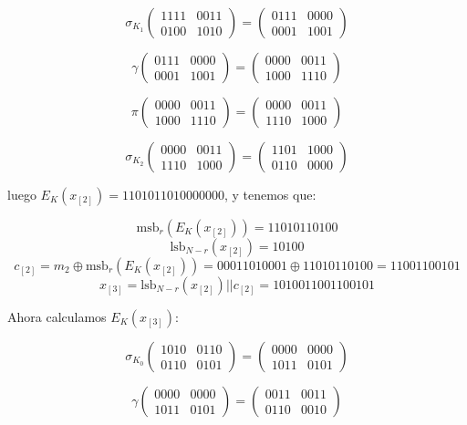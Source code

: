 \documentclass[a4paper]{article}
\begin{document}
$$\sigma_{K_1} \begin{pmatrix} 1111 & 0011 \\ 0100 & 1010 \end{pmatrix} = \begin{pmatrix} 0111 & 0000 \\ 0001 & 1001 \end{pmatrix}$$

$$\gamma \begin{pmatrix} 0111 & 0000 \\ 0001 & 1001 \end{pmatrix} = \begin{pmatrix} 0000 & 0011 \\ 1000 & 1110 \end{pmatrix}$$

$$\pi \begin{pmatrix} 0000 & 0011 \\ 1000 & 1110 \end{pmatrix} = \begin{pmatrix} 0000 & 0011 \\ 1110 & 1000 \end{pmatrix}$$

$$\sigma_{K_2} \begin{pmatrix} 0000 & 0011 \\ 1110 & 1000 \end{pmatrix} = \begin{pmatrix} 1101 & 1000 \\ 0110 & 0000 \end{pmatrix}$$

luego $E_K(x_{[2]}) = 1101 0110 1000 0000$, y tenemos que:

$$\text{msb}_r (E_K(x_{[2]})) = 1101 0110 100$$
$$\text{lsb}_{N-r} (x_{[2]}) = 10100$$
$$c_{[2]} = m_2 \oplus \text{msb}_r(E_K(x_{[2]})) = 0 0011 0100 01 \oplus 1101 0110 100 = 1100 1100 101$$
$$x_{[3]} = \text{lsb}_{N-r} (x_{[2]}) || c_{[2]} = 1010 0110 0110 0101$$

Ahora calculamos $E_K(x_{[3]})$:

$$\sigma_{K_0} \begin{pmatrix} 1010 & 0110 \\ 0110 & 0101 \end{pmatrix} = \begin{pmatrix} 0000 & 0000 \\ 1011 & 0101 \end{pmatrix}$$

$$\gamma \begin{pmatrix} 0000 & 0000 \\ 1011 & 0101 \end{pmatrix} = \begin{pmatrix} 0011 & 0011 \\ 0110 & 0010 \end{pmatrix}$$
\end{document}
